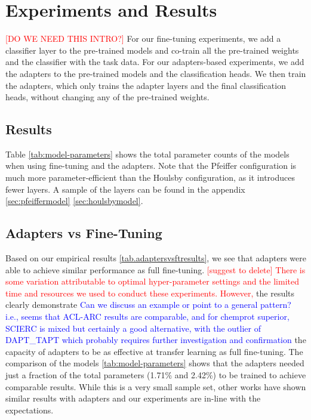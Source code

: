 \documentclass[draft,10pt,twocolumn,letterpaper]{article}
\begin{document}
\section{Experiments and Results}

\textcolor{red}{[DO WE NEED THIS INTRO?]} For our fine-tuning experiments, we add a classifier layer to the pre-trained models and co-train all the pre-trained weights and the classifier with the task data. For our adapters-based experiments, we add the adapters to the pre-trained models and the classification heads. We then train the adapters, which only trains the adapter layers and the final classification heads, without changing any of the pre-trained weights.

\subsection{Results}


Table \ref{tab:model-parameters} shows the total parameter counts of the models when using fine-tuning and the adapters. Note that the Pfeiffer configuration is much more parameter-efficient than the Houlsby configuration, as it introduces fewer layers. A sample of the layers can be found in the appendix \ref{sec:pfeiffermodel} \ref{sec:houlsbymodel}.



\subsection{Adapters vs Fine-Tuning} Based on our empirical results \ref{tab.adaptersvsftresults}, we see that adapters were able to achieve similar performance as full fine-tuning. \textcolor{red}{[suggest to delete] There is some variation attributable to optimal hyper-parameter settings and the limited time and resources we used to conduct these experiments. However,} the results clearly demonstrate \textcolor{blue}{Can we discuss an example or point to a general pattern? i.e., seems that ACL-ARC results are comparable, and for chemprot superior, SCIERC is mixed but certainly a good alternative, with the outlier of DAPT\_TAPT which probably requires further investigation and confirmation} the capacity of adapters to be as effective at transfer learning as full fine-tuning. The comparison of the models \ref{tab:model-parameters} shows that the adapters needed just a fraction of the total parameters (1.71\% and 2.42\%) to be trained to achieve comparable results. While this is a very small sample set, other works have shown similar results \cite{houlsby2019parameter} with adapters and our experiments are in-line with the expectations.
\end{document}
